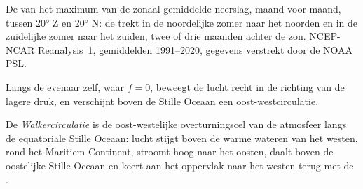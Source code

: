 \begin{omfigure}

{\small De  van het maximum van de zonaal gemiddelde neerslag, maand voor maand, tussen \ang{20} Z en \ang{20} N: de  trekt in de noordelijke zomer naar het noorden en in de zuidelijke zomer naar het zuiden, twee of drie maanden achter de zon.
NCEP-NCAR Reanalysis~1, gemiddelden 1991--2020, gegevens verstrekt door de NOAA PSL.}
\label{fig:b1:atmospheric-circulation:itcz}
\end{omfigure}

Langs de evenaar zelf, waar $f = 0$, beweegt de lucht recht in de richting van de lagere druk, en verschijnt boven de Stille Oceaan een oost-westcirculatie.

\begin{definition}[Walkercirculatie]\label{def:b1:atmospheric-circulation:walker}
De \emph{Walkercirculatie} is de oost-westelijke overturningscel van de atmosfeer langs de equatoriale Stille Oceaan: lucht stijgt boven de warme wateren van het westen, rond het Maritiem Continent,
stroomt hoog naar het oosten, daalt boven de oostelijke Stille Oceaan en keert aan het oppervlak naar het westen terug met de .
\end{definition}


